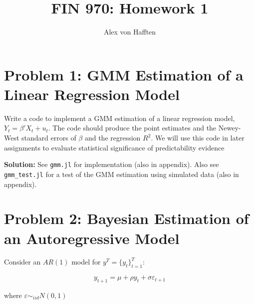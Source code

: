 \documentclass{article}
\title{FIN 970: Homework 1}
\author{Alex von Hafften }
\begin{document}
\maketitle


\section{Problem 1: GMM Estimation of a Linear Regression Model}

Write a code to implement a GMM estimation of a linear regression model, $Y_t = \beta'X_t + u_t$. The code should produce the point estimates and the Newey-West standard errors of $\beta$ and the regression $R^2$. We will use this code in later assignments to evaluate statistical significance of predictability evidence

\bigskip

\textbf{Solution:} See \texttt{gmm.jl} for implementation (also in appendix). Also see \texttt{gmm\_test.jl} for a test of the GMM estimation using simulated data (also in appendix).

\section{Problem 2: Bayesian Estimation of an Autoregressive Model}

Consider an $AR(1)$ model for $y^T = \{y_t\}_{t=1}^T$:

$$
y_{t+1} = \mu + \rho y_t+ \sigma \varepsilon_{t+1}
$$

where $\varepsilon \sim_{iid} N(0, 1)$
\end{document}
